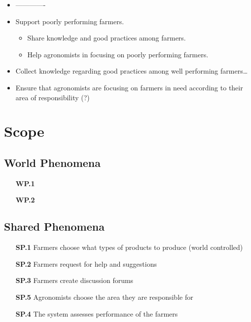 \begin{itemize}
    \item -------------
    
    \item Support poorly performing farmers.
    \begin{itemize}
        \item Share knowledge and good practices among farmers.
        \item Help agronomists in focusing on poorly performing farmers.
    \end{itemize}
    \item Collect knowledge regarding good practices among well performing farmers\dots
    \item Ensure that agronomists are focusing on farmers in need according to their area of responsibility (?)

        
\end{itemize}

\section{Scope}

\subsection{World Phenomena}

\begin{itemize}
    \item [\textbf{WP.1}] 
    \item [\textbf{WP.2}] 
\end{itemize}

\subsection{Shared Phenomena}

\begin{itemize}
    \item [\textbf{SP.1}] Farmers choose what types of products to produce (world controlled) %
    \item [\textbf{SP.2}] Farmers request for help and suggestions 
    \item [\textbf{SP.3}] Farmers create discussion forums 
    \item [\textbf{SP.5}] Agronomists choose the area they are responsible for  %
    \item [\textbf{SP.4}] The system assesses performance of the farmers
\end{itemize}

